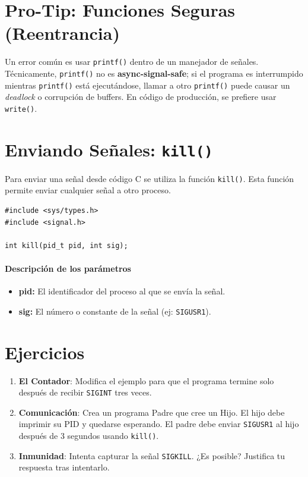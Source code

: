 \documentclass[12pt,a4paper]{article}
\begin{document}
\section{Pro-Tip: Funciones Seguras (Reentrancia)}
Un error común es usar \texttt{printf()} dentro de un manejador de señales. Técnicamente, \texttt{printf()} no es \textbf{async-signal-safe}; si el programa es interrumpido mientras \texttt{printf()} está ejecutándose, llamar a otro \texttt{printf()} puede causar un \textit{deadlock} o corrupción de buffers. En código de producción, se prefiere usar \texttt{write()}.

\section{Enviando Señales: \texttt{kill()}}
Para enviar una señal desde código C se utiliza la función \texttt{kill()}. Esta función permite enviar cualquier señal a otro proceso.

\begin{lstlisting}[numbers=none]
#include <sys/types.h>
#include <signal.h>

int kill(pid_t pid, int sig);
\end{lstlisting}

\paragraph{Descripción de los parámetros}
\begin{itemize}
    \item \textbf{pid:} El identificador del proceso al que se envía la señal.
    \item \textbf{sig:} El número o constante de la señal (ej: \texttt{SIGUSR1}).
\end{itemize}

\section{Ejercicios}
\begin{enumerate}
    \item \textbf{El Contador}: Modifica el ejemplo para que el programa termine solo después de recibir \texttt{SIGINT} tres veces.
    \item \textbf{Comunicación}: Crea un programa Padre que cree un Hijo. El hijo debe imprimir su PID y quedarse esperando. El padre debe enviar \texttt{SIGUSR1} al hijo después de 3 segundos usando \texttt{kill()}.
    \item \textbf{Inmunidad}: Intenta capturar la señal \texttt{SIGKILL}. ¿Es posible? Justifica tu respuesta tras intentarlo.
\end{enumerate}
\end{document}
